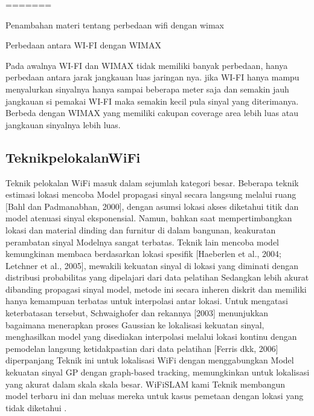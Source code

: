=======


Penambahan materi tentang perbedaan wifi dengan wimax


Perbedaan antara WI-FI dengan WIMAX

Pada awalnya WI-FI dan WIMAX tidak memiliki banyak perbedaan, hanya perbedaan antara jarak jangkauan luas jaringan nya.
jika WI-FI hanya mampu menyalurkan sinyalnya hanya sampai beberapa meter saja dan semakin jauh jangkauan si pemakai WI-FI maka
semakin kecil pula sinyal yang diterimanya. Berbeda dengan WIMAX yang memiliki cakupan coverage area lebih luas atau jangkauan 
sinyalnya lebih luas.

\subsection{TeknikpelokalanWiFi}

Teknik pelokalan WiFi masuk dalam sejumlah kategori besar. Beberapa teknik estimasi lokasi mencoba Model propagasi sinyal secara 
langsung melalui ruang [Bahl dan Padmanabhan, 2000], dengan asumsi lokasi akses diketahui titik dan model atenuasi sinyal eksponensial. 
Namun, bahkan saat mempertimbangkan lokasi dan material dinding dan furnitur di dalam bangunan, keakuratan perambatan sinyal Modelnya 
sangat terbatas. Teknik lain mencoba model kemungkinan membaca berdasarkan lokasi spesifik [Haeberlen et al., 2004; Letchner et al., 
2005], mewakili kekuatan sinyal di lokasi yang diminati dengan distribusi probabilitas yang dipelajari dari data pelatihan Sedangkan 
lebih akurat dibanding propagasi sinyal model, metode ini secara inheren diskrit dan memiliki hanya kemampuan terbatas untuk interpolasi 
antar lokasi. Untuk mengatasi keterbatasan tersebut, Schwaighofer dan rekannya [2003] menunjukkan bagaimana menerapkan proses Gaussian 
ke lokalisasi kekuatan sinyal, menghasilkan model yang disediakan interpolasi melalui lokasi kontinu dengan pemodelan langsung
ketidakpastian dari data pelatihan [Ferris dkk, 2006] diperpanjang Teknik ini untuk lokalisasi WiFi dengan menggabungkan Model kekuatan 
sinyal GP dengan graph-based tracking, memungkinkan untuk lokalisasi yang akurat dalam skala skala besar. WiFiSLAM kami Teknik membangun 
model terbaru ini dan meluas mereka untuk kasus pemetaan dengan lokasi yang tidak diketahui \cite{}.

